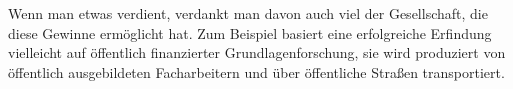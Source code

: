 Wenn man etwas verdient, verdankt man davon auch viel der Gesellschaft, die diese Gewinne ermöglicht hat.
Zum Beispiel basiert eine erfolgreiche Erfindung vielleicht auf öffentlich finanzierter Grundlagenforschung, sie wird produziert von öffentlich ausgebildeten Facharbeitern und über öffentliche Straßen transportiert.